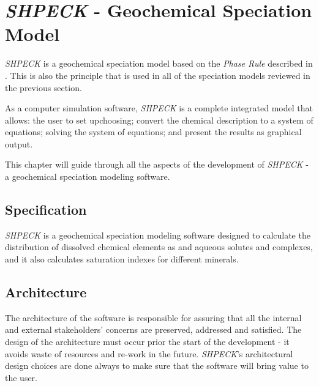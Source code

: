 
\chapter{\emph{SHPECK} - Geochemical Speciation Model}
\label{chapter:SHPECK}

\emph{SHPECK} is a geochemical speciation model based on the \emph{Phase Rule} described in \cite{Garrels:65}. This is also the principle that is used in all of the speciation models reviewed in the previous section. 

As a computer simulation software, \emph{SHPECK} is a complete integrated model that allows: the user to set upchoosing; convert the chemical description to a system of equations; solving the system of equations; and present the results as graphical output.

This chapter will guide through all the aspects of the development of \emph{SHPECK} - a geochemical speciation modeling software. 

\section{Specification}
\emph{SHPECK} is a geochemical speciation modeling software designed to calculate the distribution of dissolved chemical elements as and aqueous solutes and complexes, and it also calculates saturation indexes for different minerals. 

\section{Architecture}
The architecture of the software is responsible for assuring that all the internal and external stakeholders' concerns are preserved, addressed and satisfied. The design of the architecture must occur prior the start of the development - it avoids waste of resources and re-work in the future. \emph{SHPECK}'s architectural design choices are done always to make sure that the software will bring value to the user.


